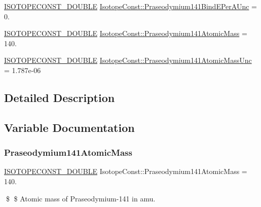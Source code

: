 \begin{DoxyCompactItemize}
\item 
\mbox{\hyperlink{group___isotope_const-_macros_ga8f45a7272ce02c0b4c65c44636ed719a}{I\+S\+O\+T\+O\+P\+E\+C\+O\+N\+S\+T\+\_\+\+D\+O\+U\+B\+LE}} \mbox{\hyperlink{group___isotope_const-_praseodymium-_pr141_ga3b672e09e65a58944c776214a4c347ab}{Isotope\+Const\+::\+Praseodymium141\+Bind\+E\+Per\+A\+Unc}} = 0.
\item 
\mbox{\hyperlink{group___isotope_const-_macros_ga8f45a7272ce02c0b4c65c44636ed719a}{I\+S\+O\+T\+O\+P\+E\+C\+O\+N\+S\+T\+\_\+\+D\+O\+U\+B\+LE}} \mbox{\hyperlink{group___isotope_const-_praseodymium-_pr141_ga7895f89e3dddb074f9ec5faa3d3983a5}{Isotope\+Const\+::\+Praseodymium141\+Atomic\+Mass}} = 140.
\item 
\mbox{\hyperlink{group___isotope_const-_macros_ga8f45a7272ce02c0b4c65c44636ed719a}{I\+S\+O\+T\+O\+P\+E\+C\+O\+N\+S\+T\+\_\+\+D\+O\+U\+B\+LE}} \mbox{\hyperlink{group___isotope_const-_praseodymium-_pr141_gaa72a19070583d157c4efec177537ad25}{Isotope\+Const\+::\+Praseodymium141\+Atomic\+Mass\+Unc}} = 1.\+787e-\/06
\end{DoxyCompactItemize}


\subsection{Detailed Description}


\subsection{Variable Documentation}
\mbox{\label{group___isotope_const-_praseodymium-_pr141_ga7895f89e3dddb074f9ec5faa3d3983a5}} 
\subsubsection{\texorpdfstring{Praseodymium141\+Atomic\+Mass}{Praseodymium141AtomicMass}}
{\footnotesize\ttfamily \mbox{\hyperlink{group___isotope_const-_macros_ga8f45a7272ce02c0b4c65c44636ed719a}{I\+S\+O\+T\+O\+P\+E\+C\+O\+N\+S\+T\+\_\+\+D\+O\+U\+B\+LE}} Isotope\+Const\+::\+Praseodymium141\+Atomic\+Mass = 140.}

\$ \$ Atomic mass of Praseodymium-\/141 in amu. \mbox{\label{group___isotope_const-_praseodymium-_pr141_gaa72a19070583d157c4efec177537ad25}} 

